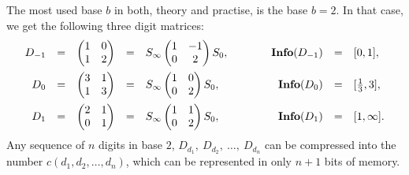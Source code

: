 \documentclass[11pt,a4paper]{article}
\begin{document}
The most used base $b$ in both, theory and practise, is the base $b=2$.
	In that case, we get the following three digit matrices:
	\[ \begin{array}{rccclcrcl}
		D_{-1} &=& \begin{pmatrix} 1&0 \\ 1&2 \end{pmatrix} &=&
			S_\infty \begin{pmatrix} 1&-1 \\0&2 \end{pmatrix} S_0, &\qquad&
			\textbf{Info}(D_{-1}) &=& [0,1], \vspace{0.5em} \\
		D_0 &=& \begin{pmatrix} 3&1 \\ 1&3 \end{pmatrix} &=&
			S_\infty \begin{pmatrix} 1&0\\0&2 \end{pmatrix} S_0, &\qquad&
			\textbf{Info}(D_0) &=& [\frac{1}{3},3], \vspace{0.5em} \\
		D_1 &=& \begin{pmatrix} 2&1 \\ 0&1 \end{pmatrix} &=&
			S_\infty \begin{pmatrix} 1&1\\0&2 \end{pmatrix} S_0, &\qquad&
			\textbf{Info}(D_1) &=& [1,\infty].
    \end{array} \]
	Any sequence of $n$ digits in base $2$, $D_{d_1},\ D_{d_2},\ \ldots,\
	D_{d_n}$ can be compressed into the number $c(d_1,d_2,\ldots,d_n)$,
	which can be represented in only $n+1$ bits of memory.
\end{document}

